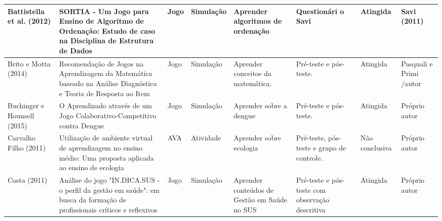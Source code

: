 \begin{table}
{\begin{tabular}{|L|m{5cm}|L|L|m{2.5cm}|m{2cm}|L|L|}
Battistella et al. (2012)      & SORTIA - Um Jogo para Ensino de Algoritmo de Ordenação: Estudo de caso na Disciplina de Estrutura de Dados                                                                                             & Jogo                  & Simulação           & Aprender algoritmos de ordenação                                           & Questionári o Savi                                                  & Atingida               & Savi (2011)                                             \\ \hline
Brito e Motta (2014)           & Recomendação de Jogos na Aprendizagem da Matemática baseado na Análise Diagnóstica e Teoria de Resposta ao Item                                                                                        & Jogo                  & Simulação           & Aprender conceitos da matemática.                                          & Pré-teste e pós- teste.                                             & Atingida               & Pasquali e Primi /autor                                 \\ \hline
Buchinger e Hounsell (2015)    & O Aprendizado através de um Jogo Colaborativo-Competitivo contra Dengue                                                                                                                                & Jogo                  & Simulação           & Aprender sobre a dengue                                                    & Pré-teste e pós- teste.                                             & Atingida               & Próprio autor                                           \\ \hline
Carvalho Filho (2011)          & Utilização de ambiente virtual de aprendizagem no ensino médio: Uma proposta aplicada ao ensino de ecologia                                                                                            & AVA                   & Atividade           & Aprender sobre ecologia                                                    & Pré-teste, pós- teste e grupo de controle.                          & Não conclusiva         & Próprio autor                                           \\ \hline
Costa (2011)                   & Análise do jogo "IN.DICA.SUS - o perfil da gestão em saúde": em busca da formação de profissionais críticos e reflexivos                                                                               & Jogo                  & Simulação           & Aprender conteúdos de Gestão em Saúde no SUS                               & Pré-teste e pós- teste com observação descritiva                    & Atingida               & Próprio autor                                           \\ \hline

\end{tabular}}
\end{table}
